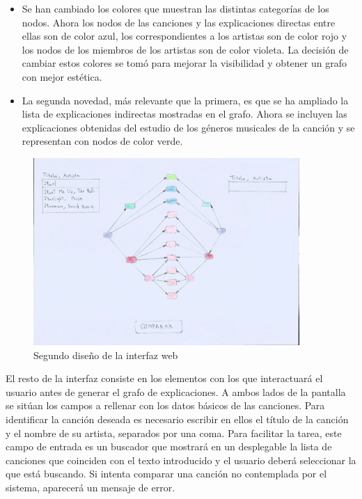 \begin{itemize}
\item Se han cambiado los colores que muestran las distintas categorías de los nodos. Ahora los nodos de las canciones y las explicaciones directas entre ellas son de color azul, los correspondientes a los artistas son de color rojo y los nodos de los miembros de los artistas son de color violeta. La decisión de cambiar estos colores se tomó para mejorar la visibilidad y obtener un grafo con mejor estética.\\

\item La segunda novedad, más relevante que la primera, es que se ha ampliado la lista de explicaciones indirectas mostradas en el grafo. Ahora se incluyen las explicaciones obtenidas del estudio de los géneros musicales de la canción y se representan con nodos de color verde.\\
\end{itemize}


\begin{figure}[h!]
	\centering
	\includegraphics[width = 0.9\textwidth]{Imagenes/Bitmap/Segunda Interfaz.jpg}
	\caption{Segundo diseño de la interfaz web}
	\label{fig:segundoDiseño}
\end{figure}

El resto de la interfaz consiste en los elementos con los que interactuará el usuario antes de generar el grafo de explicaciones. A ambos lados de la pantalla se sitúan los campos a rellenar con los datos básicos de las canciones. Para identificar la canción deseada es necesario escribir en ellos el título de la canción y el nombre de su artista, separados por una coma. Para facilitar la tarea, este campo de entrada es un buscador que mostrará en un desplegable la lista de canciones que coinciden con el texto introducido y el usuario deberá seleccionar la que está buscando. Si intenta comparar una canción no contemplada por el sistema, aparecerá un mensaje de error.\\

